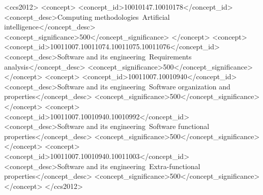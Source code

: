 \documentclass[sigconf,nonacm]{acmart}%
\begin{document}
	\begin{CCSXML}
		<ccs2012>
		<concept>
		<concept_id>10010147.10010178</concept_id>
		<concept_desc>Computing methodologies~Artificial intelligence</concept_desc>
		<concept_significance>500</concept_significance>
		</concept>
		<concept>
		<concept_id>10011007.10011074.10011075.10011076</concept_id>
		<concept_desc>Software and its engineering~Requirements analysis</concept_desc>
		<concept_significance>500</concept_significance>
		</concept>
		<concept>
		<concept_id>10011007.10010940</concept_id>
		<concept_desc>Software and its engineering~Software organization and properties</concept_desc>
		<concept_significance>500</concept_significance>
		</concept>
		<concept>
		<concept_id>10011007.10010940.10010992</concept_id>
		<concept_desc>Software and its engineering~Software functional properties</concept_desc>
		<concept_significance>500</concept_significance>
		</concept>
		<concept>
		<concept_id>10011007.10010940.10011003</concept_id>
		<concept_desc>Software and its engineering~Extra-functional properties</concept_desc>
		<concept_significance>500</concept_significance>
		</concept>
		</ccs2012>
	\end{CCSXML}
	
	
	
	
	\maketitle
	
\end{document}
